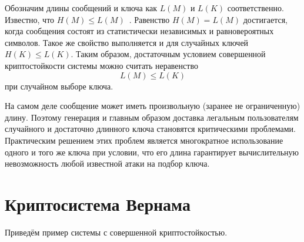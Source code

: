 

Обозначим длины сообщений и ключа как $L(M)$ и $L(K)$ соответственно. Известно, что $H(M) \leq L(M)$~\cite{GabPil:2007}. Равенство $H(M) = L(M)$ достигается, когда сообщения состоят из статистически независимых и равновероятных символов. Такое же свойство выполняется и для случайных ключей $H(K) \leq L(K)$. Таким образом, достаточным условием совершенной криптостойкости системы можно считать неравенство
 \[ L(M) \leq L(K)\]
при случайном выборе ключа.


На самом деле сообщение может иметь произвольную (заранее не ограниченную) длину. Поэтому генерация и главным образом доставка легальным пользователям случайного и достаточно длинного ключа становятся критическими проблемами. Практическим решением этих проблем является многократное использование одного и того же ключа при условии, что его длина гарантирует вычислительную невозможность любой известной атаки на подбор ключа.


\section{Криптосистема Вернама}

Приведём пример системы с совершенной криптостойкостью.

